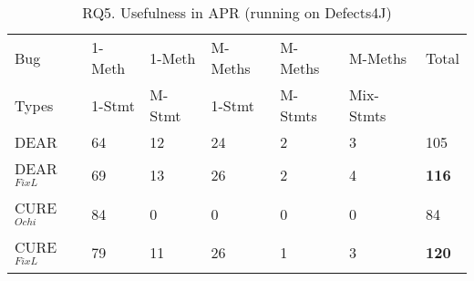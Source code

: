 \begin{table}[t]
	\caption{RQ5. Usefulness in APR (running on Defects4J)}
	\vspace{-12pt}
	\begin{center}
        \tabcolsep 2pt
		\small
		\renewcommand{\arraystretch}{1} 
		\begin{tabular}{p{1.2cm}<{\centering}|p{1cm}<{\centering}|p{1.1cm}<{\centering}|p{1.1cm}<{\centering}|p{1.2cm}<{\centering}|p{1.2cm}<{\centering}|p{0.35cm}<{\centering}}
			\hline
			Bug            & 1-Meth & 1-Meth   & M-Meths & M-Meths & M-Meths & Total\\
			Types          & 1-Stmt & M-Stmt & 1-Stmt    & M-Stmts & Mix-Stmts   & \\\hline
			DEAR%
			& 64       & 12         & 24          & 2           & 3           & 105\\
			DEAR$^{FixL}$     & 69       & 13         & 26          & 2           & 4           & {\bf 116}\\
                        \hline
                       
			CURE$^{Ochi}$%
			        & 84       & 0          & 0           & 0           & 0           & 84\\
			CURE$^{FixL}$    & 79       & 11         & 26          & 1           & 3           & {\bf 120}\\   
			\hline
		\end{tabular}
		\label{RQ5_1}
	\end{center}
\vspace{-5pt}
\end{table}

